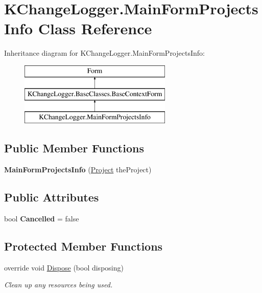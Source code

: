 \hypertarget{class_k_change_logger_1_1_main_form_projects_info}{\section{K\-Change\-Logger.\-Main\-Form\-Projects\-Info Class Reference}
\label{class_k_change_logger_1_1_main_form_projects_info}
}
Inheritance diagram for K\-Change\-Logger.\-Main\-Form\-Projects\-Info\-:\begin{figure}[H]
\begin{center}
\leavevmode
\includegraphics[height=3.000000cm]{class_k_change_logger_1_1_main_form_projects_info}
\end{center}
\end{figure}
\subsection*{Public Member Functions}
\begin{DoxyCompactItemize}
\item 
\hypertarget{class_k_change_logger_1_1_main_form_projects_info_afe03368c50d7367c577f1a570dd90458}{{\bfseries Main\-Form\-Projects\-Info} (\hyperlink{class_k_change_logger_1_1_project}{Project} the\-Project)}\label{class_k_change_logger_1_1_main_form_projects_info_afe03368c50d7367c577f1a570dd90458}

\end{DoxyCompactItemize}
\subsection*{Public Attributes}
\begin{DoxyCompactItemize}
\item 
\hypertarget{class_k_change_logger_1_1_main_form_projects_info_ab684a58ab27a8767239f2816f0739fce}{bool {\bfseries Cancelled} = false}\label{class_k_change_logger_1_1_main_form_projects_info_ab684a58ab27a8767239f2816f0739fce}

\end{DoxyCompactItemize}
\subsection*{Protected Member Functions}
\begin{DoxyCompactItemize}
\item 
override void \hyperlink{class_k_change_logger_1_1_main_form_projects_info_a1f6605c259b956c9967b9c1ab72d4dd2}{Dispose} (bool disposing)
\begin{DoxyCompactList}\small\item\em Clean up any resources being used. \end{DoxyCompactList}\end{DoxyCompactItemize}


